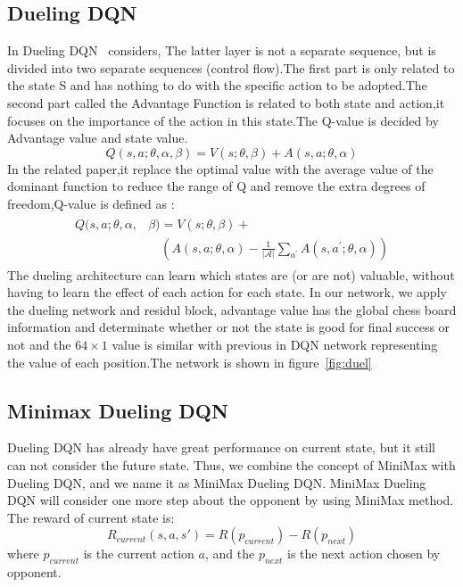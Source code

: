 \documentclass[10pt,twocolumn,letterpaper]{article}
\begin{document}
\subsection{Dueling DQN}

In Dueling DQN~\cite{DBLP:journals/corr/WangFL15} considers, The latter layer is not a separate sequence, but is divided into two separate sequences (control flow).The first part is only related to the state S and has nothing to do with the specific action to be adopted.The second part called the Advantage Function is related to both state and action,it focuses on the importance of the action in this state.The Q-value is decided by Advantage value and state value.
$$
Q(s, a ; \theta, \alpha, \beta)=V(s ; \theta, \beta)+A(s, a ; \theta, \alpha)
$$
\quad In the related paper,it replace the optimal value with the average value of the dominant function to reduce the range of Q and remove the extra degrees of freedom,Q-value is defined as :
\begin{align*}
\begin{split}
Q(s, a ; \theta, \alpha, &\beta)=V(s ; \theta, \beta) +\\
&\quad \left(A(s, a ; \theta, \alpha)-\frac{1}{|\mathcal{A}|} \sum_{a^{\prime}} A\left(s, a^{\prime} ; \theta, \alpha\right)\right)
\end{split}
\end{align*}
\quad The dueling architecture can learn which states are (or are not) valuable, without having to learn the effect of each action for each state. In our network, we apply the dueling network and residul block, advantage value has the global chess board information and determinate whether or not the state is good for final success or not and the $64 \times 1 $ value is similar with previous in DQN network representing the value of each position.The network is shown in figure~\ref{fig:duel}

\subsection{Minimax Dueling DQN}
\quad Dueling DQN has already have great performance on current state, but it still can not consider the future state. Thus, we combine the concept of MiniMax with Dueling DQN, and we name it as MiniMax Dueling DQN.
\quad MiniMax Dueling DQN will consider one more step about the opponent by using MiniMax method. The reward of current state is:
$$ R_{current}\left(s,a,s'\right) = R\left(p_{current}\right) - R\left(p_{next}\right) $$
where $p_{current}$ is the current action $a$, and the $p_{next}$ is the next action chosen by opponent.
\end{document}
